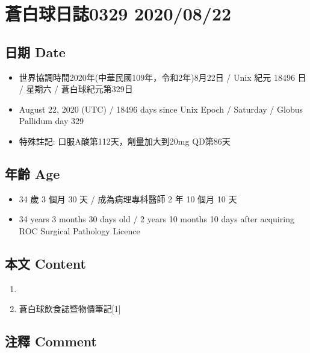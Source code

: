 \documentclass[a5paper, 11pt
]{book}
\providecommand{\tightlist}{%
  \setlength{\itemsep}{0pt}\setlength{\parskip}{0pt}}
\begin{document}
\hypertarget{ux84bcux767dux7403ux65e5ux8a8c0329-20200822}{%
\section{蒼白球日誌0329
2020/08/22}\label{ux84bcux767dux7403ux65e5ux8a8c0329-20200822}}

\hypertarget{ux65e5ux671f-date-82}{%
\subsection{日期 Date}\label{ux65e5ux671f-date-82}}

\begin{itemize}
\tightlist
\item
  世界協調時間2020年(中華民國109年，令和2年)8月22日 / Unix 紀元 18496 日
  / 星期六 / 蒼白球紀元第329日
\item
  August 22, 2020 (UTC) / 18496 days since Unix Epoch / Saturday /
  Globus Pallidum day 329
\item
  特殊註記: 口服A酸第112天，劑量加大到20mg QD第86天
\end{itemize}

\hypertarget{ux5e74ux9f61-age-82}{%
\subsection{年齡 Age}\label{ux5e74ux9f61-age-82}}

\begin{itemize}
\tightlist
\item
  34 歲 3 個月 30 天 / 成為病理專科醫師 2 年 10 個月 10 天
\item
  34 years 3 months 30 days old / 2 years 10 months 10 days after
  acquiring ROC Surgical Pathology Licence
\end{itemize}

\hypertarget{ux672cux6587-content-82}{%
\subsection{本文 Content}\label{ux672cux6587-content-82}}

\begin{enumerate}
\def\labelenumi{\arabic{enumi}.}
\tightlist
\item
\item
  蒼白球飲食誌暨物價筆記{[}1{]}
\end{enumerate}

\hypertarget{ux6ce8ux91cb-comment-82}{%
\subsection{注釋 Comment}\label{ux6ce8ux91cb-comment-82}}
\end{document}
